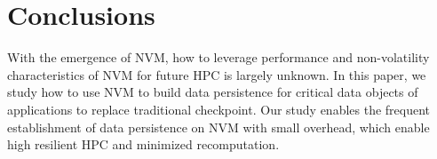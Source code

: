 \section{Conclusions}
\begin{spacing}{0.9}
With the emergence of NVM, how to leverage performance and non-volatility characteristics of NVM for future HPC is largely unknown.
In this paper, we study how to use NVM to build data persistence for critical data objects of applications to replace traditional checkpoint.
Our study enables the frequent establishment of data persistence on NVM
with small overhead, which enable high resilient HPC and minimized recomputation.
\end{spacing}